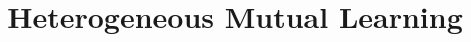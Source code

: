 \documentclass[9pt]{IEEEtran}
\begin{document}
\title{Heterogeneous Mutual Learning}
\end{document}
